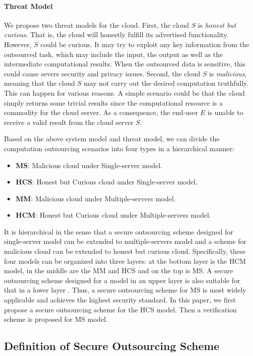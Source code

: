 \documentclass[english,draftcls,onecolumn,11pt]{IEEEtran}
\theoremstyle{definition}
\theoremstyle{plain}
\theoremstyle{plain}
\theoremstyle{definition}
\begin{document}
\paragraph{Threat Model}

We propose two threat models for the cloud. First, the cloud $S$
is \textit{honest but curious}. That is, the cloud will honestly fulfill
its advertised functionality. However, $S$ could be curious. It may
try to exploit any key information from the outsourced task, which
may include the input, the output as well as the intermediate computational
results. When the outsourced data is sensitive, this could cause severe
security and privacy issues. Second, the cloud $S$ is \textit{malicious},
meaning that the cloud $S$ may not carry out the desired computation
truthfully. This can happen for various reasons. A simple scenario
could be that the cloud simply returns some trivial results since
the computational resource is a commodity for the cloud server. As
a consequence, the end-user $E$ is unable to receive a valid result
from the cloud server $S$. 

Based on the above system model and threat model, we can divide the
computation outsourcing scenarios into four types in a hierarchical
manner: 
\begin{itemize}
\item \textbf{MS}: Malicious cloud under Single-server model. 
\item \textbf{HCS}: Honest but Curious cloud under Single-server model.
\item \textbf{MM}: Malicious cloud under Multiple-servers model.
\item \textbf{HCM}: Honest but Curious cloud under Multiple-servers model. 
\end{itemize}
It is hierarchical in the sense that a secure outsourcing scheme designed
for single-server model can be extended to multiple-servers model
and a scheme for malicious cloud can be extended to honest but curious
cloud. Specifically, these four models can be organized into three
layers: at the bottom layer is the HCM model, in the middle are the
MM and HCS and on the top is MS. A secure outsourcing scheme designed
for a model in an upper layer is also suitable for that in a lower
layer . Thus, a secure outsourcing scheme for MS is most widely applicable
and achieves the highest security standard. In this paper, we first
propose a secure outsourcing scheme for the HCS model. Then a verification
scheme is proposed for MS model.


\subsection{Definition of Secure Outsourcing Scheme}
\end{document}
